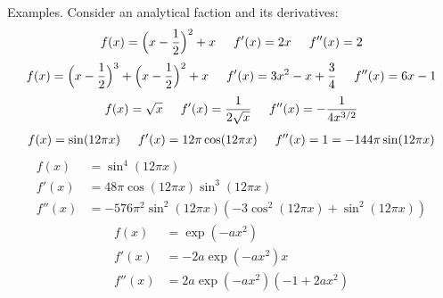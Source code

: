 \documentclass{article}
\begin{document}
Examples. Consider an analytical faction and its derivatives:
\begin{equation}
	\label{func:ex1}
	\begin{aligned}
	f(x) = \Big(x - \frac{1}{2}\Big)^2 + x \hspace{5mm}
	f'(x) = 2x \hspace{5mm}
	f''(x) = 2 
	\end{aligned}
\end{equation}
\begin{equation}
\label{func:ex2}
\begin{aligned}
f(x) = \Big(x - \frac{1}{2}\Big)^3 + \Big(x-\frac{1}{2}\Big)^2 + x \hspace{5mm}
f'(x) = 3x^2 -x + \frac{3}{4} \hspace{5mm}
f''(x) = 6x - 1
\end{aligned}
\end{equation}
\begin{equation}
\label{func:ex3}
\begin{aligned}
	f(x) = \sqrt{x} \hspace{5mm}
	f'(x) = \frac{1}{2\sqrt{x}} \hspace{5mm}
	f''(x) = - \frac{1}{4 x^{3/2}}
\end{aligned}
\end{equation}
\begin{equation}
\label{func:ex4}
\begin{aligned}
f(x) = \sin(12\pi x) \hspace{5mm}
f'(x) = 12\pi\cos(12\pi x) \hspace{5mm}
f''(x) = 1 = -144\pi\sin(12\pi x)
\end{aligned}
\end{equation}
\begin{equation}
\label{func:ex5}
\begin{aligned}
f(x) &= \sin^4(12\pi x) \\ 
f'(x) &= 48 \pi \cos(12 \pi x) \sin^3(12 \pi x)  \\
f''(x) &=  -576 \pi^2 \sin^2(12 \pi x) (-3 \cos^2(12 \pi x) + \sin^2(12 \pi x))
\end{aligned}
\end{equation}
\begin{equation}
\label{func:ex6}
\begin{aligned}
f(x) &= \exp(-a x^2) \\ 
f'(x) &= -2 a \exp(-a x^2) x  \\
f''(x) &=  2 a \exp(-a x^2) (-1 + 2 a x^2)
\end{aligned}
\end{equation}
\end{document}
